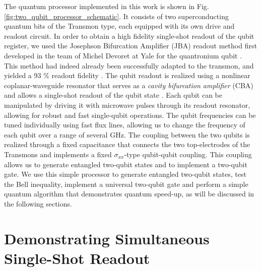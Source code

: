 The quantum processor implemented in this work is shown in Fig. \ref{fig:two_qubit_processor_schematic}.
It consists of two superconducting quantum bits of the Transmon type,
each equipped with its own drive and readout circuit. In order to
obtain a high fidelity single-shot readout of the qubit register,
we used the Josephson Bifurcation Amplifier (JBA) readout method first
developed in the team of Michel Devoret at Yale for the quantronium
qubit \citep{siddiqi_rf-driven_2004,vijay_invited_2009}. This method
had indeed already been successfully adapted to the transmon, and
yielded a 93 \% readout fidelity \citep{mallet_single-shot_2009}.
The qubit readout is realized using a nonlinear coplanar-waveguide
resonator that serves as a \textit{cavity bifurcation amplifier} (CBA)\citep{siddiqi_dispersive_2006,vijay_invited_2009}
and allows a single-shot readout of the qubit state \citep{mallet_single-shot_2009}.
Each qubit can be manipulated by driving it with microwave pulses
through its readout resonator, allowing for robust and fast single-qubit
operations. The qubit frequencies can be tuned individually using
fast flux lines, allowing us to change the frequency of each qubit
over a range of several GHz. The coupling between the two qubits is
realized through a fixed capacitance that connects the two top-electrodes
of the Transmons and implements a fixed $\sigma_{xx}$-type qubit-qubit
coupling. This coupling allows us to generate entangled two-qubit
states and to implement a two-qubit gate. We use this simple processor
to generate entangled two-qubit states, test the Bell inequality,
implement a universal two-qubit gate and perform a simple quantum
algorithm that demonstrates quantum speed-up, as will be discussed
in the following sections.


\section{Demonstrating Simultaneous Single-Shot Readout}

